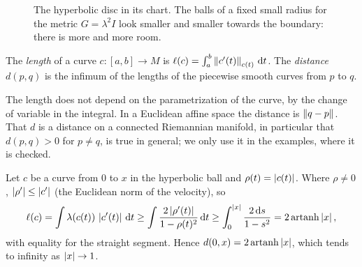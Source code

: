 \begin{notechapter}
\begin{figure}[ht]
\centering
{}
\caption{The hyperbolic disc in its chart. The balls of a fixed small
radius for the metric $G = \lambda^2I$ look smaller and smaller towards
the boundary: there is more and more room.}
\label{riemannian-optimization:fig:ball}
\end{figure}

\begin{definition}
\label{riemannian-optimization:def:length}
The \emph{length} of a curve $c:[a, b]\to M$ is
$\ell(c) = \int_a^b\left\|c'(t)\right\|_{c(t)}\,\mathrm{d} t$. The \emph{distance}
$d(p, q)$ is the infimum of the lengths of the piecewise smooth curves
from $p$ to $q$.
\end{definition}

The length does not depend on the parametrization of the curve, by the
change of variable in the integral. In a Euclidean affine space the
distance is $\left\|q - p\right\|$. That $d$ is a distance on a connected
Riemannian manifold, in particular that $d(p, q) > 0$ for $p\neq q$, is
true in general; we only use it in the examples, where it is checked.

\begin{example}
\label{riemannian-optimization:ex:radial}
Let $c$ be a curve from $0$ to $x$ in the hyperbolic ball and
$\rho(t) = \left|c(t)\right|$. Where $\rho\neq0$,
$\left|\rho'\right|\leq\left|c'\right|$ (the Euclidean norm of the velocity), so
\[
  \ell(c) = \int\lambda(c(t))\,\left|c'(t)\right|\,\mathrm{d} t
  \geq\int\frac{2\left|\rho'(t)\right|}{1 - \rho(t)^2}\,\mathrm{d} t
  \geq\int_0^{\left|x\right|}\frac{2\,\mathrm{d} s}{1 - s^2}
  = 2\operatorname{artanh}\left|x\right| ,
\]
with equality for the straight segment. Hence
$d(0, x) = 2\operatorname{artanh}\left|x\right|$, which tends to infinity as
$\left|x\right|\to1$.
\end{example}


\end{notechapter}
